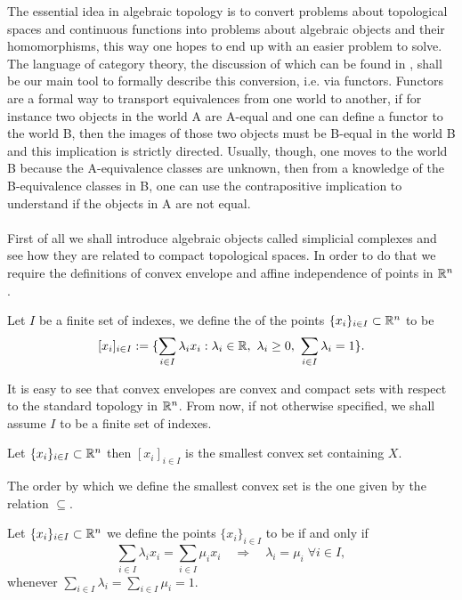 \documentclass[../1.tex]{subfiles}
\begin{document}
    The essential idea in algebraic topology is to convert problems about topological spaces and continuous functions into
    problems about algebraic objects and their homomorphisms, this way one hopes to end up with an easier problem to solve. 
    The language of category theory, the discussion of which can be found in \cite{rotman}, shall be our main tool to formally
    describe this conversion, i.e. via functors. Functors are a formal way to transport equivalences from one world to another, 
    if for instance two objects in the world A are A-equal and one can define a functor to the world B, then the images of those two objects 
    must be B-equal in the world B and this implication is strictly directed. Usually, though, one moves to the world B because the A-equivalence
    classes are unknown, then from a knowledge of the B-equivalence classes in B, one can use the contrapositive implication 
    to understand if the objects in A are not equal.\\
    \hfill \\
    First of all we shall introduce algebraic objects called simplicial complexes and see how they are related to compact
    topological spaces. In order to do that we require the definitions of convex envelope and affine independence of points in $\mathbb{R}^n$.

    \begin{defn}
        Let $I$ be a finite set of indexes, we define the  of the points $\{x_i\}_{i \in I} \subset \mathbb{R}^n$ to be 
        \[ [ x_i ]_{i \in I} := \{ \sum_{i \in I} \lambda_i x_i : \lambda_i \in \mathbb{R},\ \lambda_i \geq 0,\  \sum_{i \in I} \lambda_i = 1 \}.\]
    \end{defn}

    It is easy to see that convex envelopes are convex and compact sets with respect to the standard topology in $\mathbb{R}^n$.
    From now, if not otherwise specified, we shall assume $I$ to be a finite set of indexes.

    \begin{prop}
        Let $\{x_i\}_{i \in I} \subset \mathbb{R}^n$ then $[ x_i ]_{i \in I}$ is the smallest convex set containing $X$.
    \end{prop}

    The order by which we define the smallest convex set is the one given by the relation $\subseteq$.


    \begin{defn}
        Let $\{x_i\}_{i \in I} \subset \mathbb{R}^n$ we define the points $\{x_i\}_{i \in I}$ to be  if and only if
        \[ \sum_{i \in I} \lambda_i x_i = \sum_{i \in I} \mu_i x_i \quad \Rightarrow \quad 
        \lambda_i = \mu_i \; \forall i \in I ,\]
        whenever $\sum_{i \in I} \lambda_i = \sum_{i \in I} \mu_i = 1$.
    \end{defn}
\end{document}

